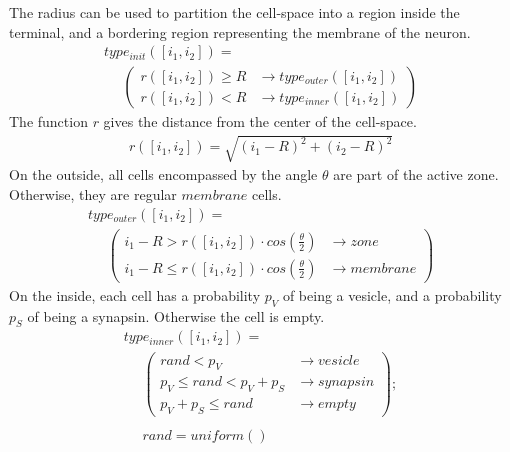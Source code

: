 \documentclass{acm_proc_article-sp}
\begin{document}
The radius can be used to partition the cell-space into a region inside 
the terminal, and a bordering region representing the membrane of the
neuron.
\begin{displaymath} \begin{array}{l}
type_{init}([i_1, i_2]) = \\
\hspace{16pt} \left( \begin{array}{ll} r([i_1, i_2]) \ge R & \rightarrow type_{outer}([i_1, i_2]) \\
                                       r([i_1, i_2]) < R   & \rightarrow type_{inner}([i_1, i_2]) \end{array} \right) 
\end{array} \end{displaymath}
The function $r$ gives the distance from the center of the cell-space.
\begin{displaymath} \begin{array}{l}
r([i_1, i_2]) = \sqrt{(i_1 - R)^2 + (i_2 - R)^2}
\end{array} \end{displaymath}
On the outside, all cells encompassed by the angle $\theta$ are part of
the active zone.  Otherwise, they are regular $membrane$ cells.
\begin{displaymath} \begin{array}{l}
type_{outer}([i_1, i_2]) = \\
\hspace{16pt} \left( \begin{array}{ll} i_1 - R > r([i_1, i_2]) \cdot cos(\frac{\theta}{2})   & \rightarrow zone \\
                                       i_1 - R \le r([i_1, i_2]) \cdot cos(\frac{\theta}{2}) & \rightarrow membrane \end{array} \right)
\end{array} \end{displaymath}
On the inside, each cell has a probability $p_V$ of being a vesicle, and
a probability $p_S$ of being a synapsin.  Otherwise the cell is empty.
\begin{displaymath} \begin{array}{l}
type_{inner}([i_1, i_2]) = \\
\hspace{16pt} \left( \begin{array}{ll} rand < p_V               & \rightarrow vesicle \\
                                       p_V \le rand < p_V + p_S & \rightarrow synapsin \\
                                       p_V + p_S \le rand       & \rightarrow empty \end{array} \right); \\
\\
\hspace{16pt} rand = uniform()
\end{array} \end{displaymath}
\end{document}

